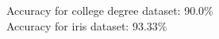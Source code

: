 \begin{answer}

Accuracy for college degree dataset: 90.0\% \\
Accuracy for iris dataset: 93.33\% \\
\end{answer}